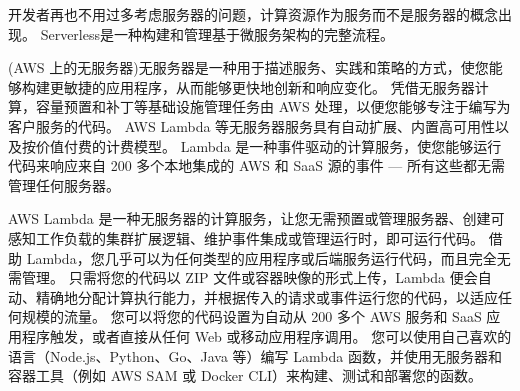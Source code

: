 \begin{definition}[Serverless]
    开发者再也不用过多考虑服务器的问题，计算资源作为服务而不是服务器的概念出现。 Serverless是一种构建和管理基于微服务架构的完整流程。

    (AWS 上的无服务器)无服务器是一种用于描述服务、实践和策略的方式，使您能够构建更敏捷的应用程序，从而能够更快地创新和响应变化。 凭借无服务器计算，容量预置和补丁等基础设施管理任务由 AWS 处理，以便您能够专注于编写为客户服务的代码。 AWS Lambda 等无服务器服务具有自动扩展、内置高可用性以及按价值付费的计费模型。 Lambda 是一种事件驱动的计算服务，使您能够运行代码来响应来自 200 多个本地集成的 AWS 和 SaaS 源的事件 — 所有这些都无需管理任何服务器。 
\end{definition}

\begin{definition}
    AWS Lambda 是一种无服务器的计算服务，让您无需预置或管理服务器、创建可感知工作负载的集群扩展逻辑、维护事件集成或管理运行时，即可运行代码。 借助 Lambda，您几乎可以为任何类型的应用程序或后端服务运行代码，而且完全无需管理。 只需将您的代码以 ZIP 文件或容器映像的形式上传，Lambda 便会自动、精确地分配计算执行能力，并根据传入的请求或事件运行您的代码，以适应任何规模的流量。 您可以将您的代码设置为自动从 200 多个 AWS 服务和 SaaS 应用程序触发，或者直接从任何 Web 或移动应用程序调用。 您可以使用自己喜欢的语言（Node.js、Python、Go、Java 等）编写 Lambda 函数，并使用无服务器和容器工具（例如 AWS SAM 或 Docker CLI）来构建、测试和部署您的函数。 
\end{definition}


